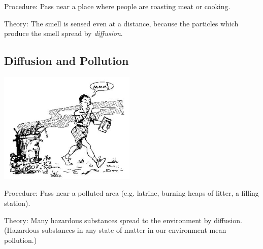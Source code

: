 \begin{multicols}{2}
\begin{description*}
\item[Procedure:]{Pass near a place where people are roasting meat or cooking.}
\item[Theory:]{The smell is sensed even at a distance, because the particles which produce the smell
spread by \emph{diffusion}.}
\end{description*}

\subsection{Diffusion and Pollution}

\begin{center}
\includegraphics[width=0.49\textwidth]{./img/source/diffusion-pollution.jpg}
\end{center}

\begin{description*}
\item[Procedure:]{Pass near a polluted area (e.g. latrine, burning heaps of litter, a filling station).}
\item[Theory:]{Many hazardous substances spread to the environment by diffusion. (Hazardous
substances in any state of matter in our environment mean pollution.)}
\end{description*}


\end{multicols}
